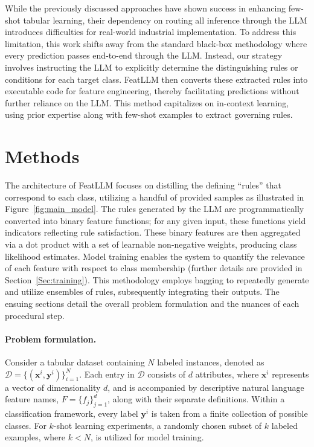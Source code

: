 While the previously discussed approaches have shown success in enhancing few-shot tabular learning, their dependency on routing all inference through the LLM introduces difficulties for real-world industrial implementation. To address this limitation, this work shifts away from the standard black-box methodology where every prediction passes end-to-end through the LLM. Instead, our strategy involves instructing the LLM to explicitly determine the distinguishing rules or conditions for each target class. \textsf{FeatLLM} then converts these extracted rules into executable code for feature engineering, thereby facilitating predictions without further reliance on the LLM. This method capitalizes on in-context learning, using prior expertise along with few-shot examples to extract governing rules.

\section{Methods}
The architecture of \textsf{FeatLLM} focuses on distilling the defining “rules” that correspond to each class, utilizing a handful of provided samples as illustrated in Figure~\ref{fig:main_model}. The rules generated by the LLM are programmatically converted into binary feature functions; for any given input, these functions yield indicators reflecting rule satisfaction. These binary features are then aggregated via a dot product with a set of learnable non-negative weights, producing class likelihood estimates. Model training enables the system to quantify the relevance of each feature with respect to class membership (further details are provided in Section~\ref{Sec:training}). This methodology employs bagging to repeatedly generate and utilize ensembles of rules, subsequently integrating their outputs. The ensuing sections detail the overall problem formulation and the nuances of each procedural step.

\vspace*{-0.12in}
\paragraph{Problem formulation.} Consider a tabular dataset containing $N$ labeled instances, denoted as $\mathcal{D} = \{(\mathbf{x}^i, \mathbf{y}^i)\}_{i=1}^{N}$. Each entry in $\mathcal{D}$ consists of $d$ attributes, where $\mathbf{x}^i$ represents a vector of dimensionality $d$, and is accompanied by descriptive natural language feature names, $F = \{f_j\}_{j=1}^{d}$, along with their separate definitions. Within a classification framework, every label $\mathbf{y}^i$ is taken from a finite collection of possible classes. For $k$-shot learning experiments, a randomly chosen subset of $k$ labeled examples, where $k < N$, is utilized for model training.

